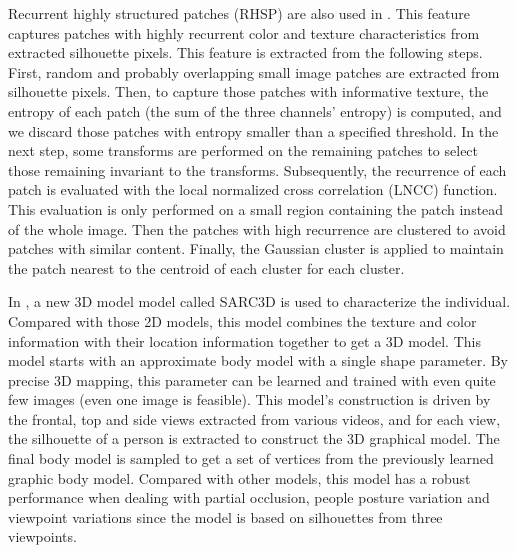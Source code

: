 Recurrent highly structured patches (RHSP) are also used in \cite{SDALF}. This feature captures patches with highly recurrent color and texture characteristics from extracted silhouette pixels. This feature is extracted from the following steps. First, random and probably overlapping small image patches are extracted from silhouette pixels. Then, to capture those patches with informative texture, the entropy of each patch (the sum of the three channels' entropy) is computed, and we discard those patches with entropy smaller than a specified threshold. In the next step, some transforms are performed on the remaining patches to select those remaining invariant to the transforms. Subsequently, the recurrence of each patch is evaluated with the local normalized cross correlation (LNCC) function. This evaluation is only performed on a small region containing the patch instead of the whole image. Then the patches with high recurrence are clustered to avoid patches with similar content. Finally, the Gaussian cluster is applied to maintain the patch nearest to the centroid of each cluster for each cluster.

In \cite{SARC3D}, a new 3D model model called SARC3D  is used to characterize the individual. Compared with those 2D models, this model combines the texture and color information with their location information together to get a 3D model. This model starts with an approximate body model with a single shape parameter. By precise 3D mapping, this parameter can be learned and trained with even quite few images (even one image is feasible). This model's construction is driven by the frontal, top and side views extracted from various videos, and for each view, the silhouette of a person is extracted to construct the 3D graphical model. The final body model is sampled to get a set of vertices from the previously learned graphic body model. Compared with other models, this model has a robust performance when dealing with partial occlusion, people posture variation and viewpoint variations since the model is based on silhouettes from three viewpoints.

